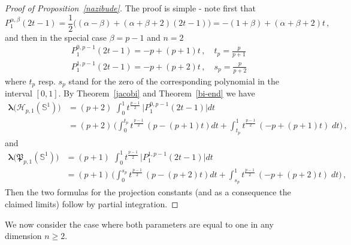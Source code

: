 \documentclass[12pt]{amsart}
\numberwithin{subsection}{section}
\theoremstyle{definition}
\theoremstyle{remark}
\begin{document}

      \begin{proof}[Proof of Proposition~\ref{nazibude}]
             The proof is simple - note first that
 \begin{equation}\label{degree1}
   P_1^{\alpha, \beta}(2t -1) = \frac{1}{2}\big((\alpha-\beta) + (\alpha+\beta+2)(2t -1)\big)
   = -(1+\beta)+(\alpha+\beta+2)t \,,
 \end{equation}
and then in the special case  $\beta = p-1 $ and  $n=2 $
\begin{equation}\label{degree1special}
\begin{split}
&
   P_1^{0, p-1}(2t -1) = -p + (p+1)t\,, \quad t_p=\frac{p}{p+1}
   \\&
     P_1^{1, p-1}(2t -1) =  -p + (p+2)t\,, \quad s_p=\frac{p}{p+2}
\end{split}
    \end{equation}
    where  $t_p $ resp.  $s_p $ stand for the zero of the corresponding polynomial in the interval  $[0,1] $. By
Theorem~\ref{jacobi} and Theorem~\ref{bi-end} we have
       \begin{align*}
  \boldsymbol{\lambda}\big(\mathcal{H}_{p,1}(\mathbb{S}^{1})\big)
  &
  = (p+2)\,\, \int_{0}^{1}  t^{\frac{p-1}{2}} \,\big| P_{1}^{0,p-1}(2t -1)\big| dt
  \\&
  =(p+2)\,\bigg( \int_{0}^{t_p}  t^{\frac{p-1}{2}} \,(p - (p+1)t) dt + \int_{t_p}^{1}  t^{\frac{p-1}{2}} \,(-p + (p+1)t) \;dt\bigg)
  \,,
\end{align*}
and
\begin{align*}
  \boldsymbol{\lambda}\big(\mathfrak{P}_{p,1}(\mathbb{S}^{1})\big)
  &
  = (p+1)\,\, \int_{0}^{1}  t^{\frac{p-1}{2}} \,\big| P_{1}^{1,p-1}(2t -1)\big| dt
  \\&
  =(p+1)\,\bigg( \int_{0}^{s_p}  t^{\frac{p-1}{2}} \,(p - (p+2)t) dt + \int_{s_p}^{1}  t^{\frac{p-1}{2}} \,(-p + (p+2)t)\;dt\bigg)
  \,,
\end{align*}
Then the two formulas for the projection constants (and as a consequence the claimed limits) follow by  partial integration.
          \end{proof}


We now consider the case where both parameters are equal to one in any dimension  $ n \geq 2  $.
\end{document}
